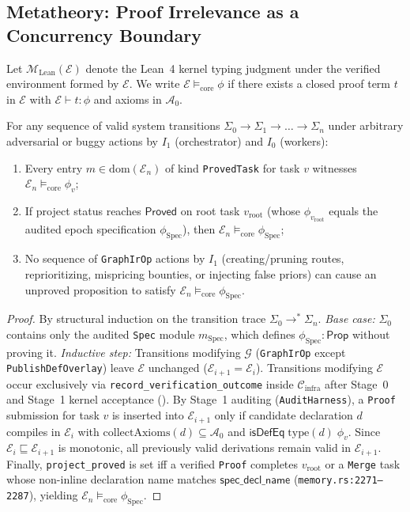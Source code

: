 \documentclass[sigplan,nonacm,10pt]{acmart}
\newcommand{\Cinfra}{\mathcal{C}_{\mathrm{infra}}}
\newcommand{\Truth}{\mathcal{E}}
\newcommand{\Orch}{\mathcal{G}}
\newcommand{\Spec}{\mathrm{Spec}}
\newcommand{\Prop}{\mathsf{Prop}}
\newcommand{\AxiomsZero}{\mathcal{A}_0}
\newcommand{\kw}[1]{\mathsf{#1}}
\newcommand{\code}[1]{\texttt{#1}}
\begin{document}
\subsection{Metatheory: Proof Irrelevance as a Concurrency Boundary}

Let $\mathcal{M}_{\mathrm{Lean}}(\Truth)$ denote the Lean~4 kernel typing judgment under the verified environment formed by $\Truth$. We write $\Truth \models_{\mathrm{core}} \phi$ if there exists a closed proof term $t$ in $\Truth$ with $\Truth \vdash t : \phi$ and axioms in $\AxiomsZero$.

\begin{theorem}\label{thm:non-interference}
For any sequence of valid system transitions $\Sigma_0 \to \Sigma_1 \to \dots \to \Sigma_n$ under arbitrary adversarial or buggy actions by $I_1$ (orchestrator) and $I_0$ (workers):
\begin{enumerate}
  \item Every entry $m \in \mathrm{dom}(\Truth_n)$ of kind \code{ProvedTask} for task $v$ witnesses $\Truth_n \models_{\mathrm{core}} \phi_v$;
  \item If project status reaches $\kw{Proved}$ on root task $v_{\mathrm{root}}$ (whose $\phi_{v_{\mathrm{root}}}$ equals the audited epoch specification $\phi_{\Spec}$), then $\Truth_n \models_{\mathrm{core}} \phi_{\Spec}$;
  \item No sequence of \code{GraphIrOp} actions by $I_1$ (creating/pruning routes, reprioritizing, mispricing bounties, or injecting false priors) can cause an unproved proposition to satisfy $\Truth_n \models_{\mathrm{core}} \phi_{\Spec}$.
\end{enumerate}
\end{theorem}

\begin{proof}
By structural induction on the transition trace $\Sigma_0 \to^* \Sigma_n$.
\emph{Base case:} $\Sigma_0$ contains only the audited \code{Spec} module $m_{\Spec}$, which defines $\phi_{\Spec} : \Prop$ without proving it.
\emph{Inductive step:} Transitions modifying $\Orch$ (\code{GraphIrOp} except \code{PublishDefOverlay}) leave $\Truth$ unchanged ($\Truth_{i+1} = \Truth_i$). Transitions modifying $\Truth$ occur exclusively via \code{record\_verification\_outcome} inside $\Cinfra$ after Stage~0 and Stage~1 kernel acceptance (). By Stage~1 auditing (\code{AuditHarness}), a \code{Proof} submission for task $v$ is inserted into $\Truth_{i+1}$ only if candidate declaration $d$ compiles in $\Truth_i$ with $\mathrm{collectAxioms}(d) \subseteq \AxiomsZero$ and $\kw{isDefEq}\;\mathrm{type}(d)\;\phi_v$. Since $\Truth_i \sqsubseteq \Truth_{i+1}$ is monotonic, all previously valid derivations remain valid in $\Truth_{i+1}$. Finally, \code{project\_proved} is set iff a verified \code{Proof} completes $v_{\mathrm{root}}$ or a \code{Merge} task whose non-inline declaration name matches $\kw{spec\_decl\_name}$ (\code{memory.rs:2271--2287}), yielding $\Truth_n \models_{\mathrm{core}} \phi_{\Spec}$.
\end{proof}
\end{document}
